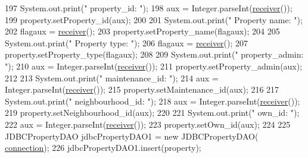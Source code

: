 \begin{DoxyCode}
197                         System.out.print(\textcolor{stringliteral}{"    property\_id: "});
198                         aux =  Integer.parseInt(\mbox{\hyperlink{classcms_1_1_c_m_s_ad13be0e97a0bb295dcedd134942a79b4}{receiver}}());
199                         \textcolor{keyword}{property}.setProperty\_id(aux);
200                         
201                         System.out.print(\textcolor{stringliteral}{"    Property name: "});
202                         flagaux = \mbox{\hyperlink{classcms_1_1_c_m_s_ad13be0e97a0bb295dcedd134942a79b4}{receiver}}();
203                         \textcolor{keyword}{property}.setProperty\_name(flagaux);
204                         
205                         System.out.print(\textcolor{stringliteral}{"    Property type: "});
206                         flagaux = \mbox{\hyperlink{classcms_1_1_c_m_s_ad13be0e97a0bb295dcedd134942a79b4}{receiver}}();
207                         \textcolor{keyword}{property}.setProperty\_type(flagaux);
208                         
209                         System.out.print(\textcolor{stringliteral}{"    property\_admin: "});
210                         aux =  Integer.parseInt(\mbox{\hyperlink{classcms_1_1_c_m_s_ad13be0e97a0bb295dcedd134942a79b4}{receiver}}());
211                         \textcolor{keyword}{property}.setProperty\_admin(aux);
212                                 
213                         System.out.print(\textcolor{stringliteral}{"    maintenance\_id: "});
214                         aux =  Integer.parseInt(\mbox{\hyperlink{classcms_1_1_c_m_s_ad13be0e97a0bb295dcedd134942a79b4}{receiver}}());
215                         \textcolor{keyword}{property}.setMaintenance\_id(aux);
216                         
217                         System.out.print(\textcolor{stringliteral}{"    neighbourhood\_id: "});
218                         aux =  Integer.parseInt(\mbox{\hyperlink{classcms_1_1_c_m_s_ad13be0e97a0bb295dcedd134942a79b4}{receiver}}());
219                         \textcolor{keyword}{property}.setNeighbourhood\_id(aux);
220                         
221                         System.out.print(\textcolor{stringliteral}{"    own\_id: "});
222                         aux =  Integer.parseInt(\mbox{\hyperlink{classcms_1_1_c_m_s_ad13be0e97a0bb295dcedd134942a79b4}{receiver}}());
223                         \textcolor{keyword}{property}.setOwn\_id(aux);
224                         
225                         JDBCPropertyDAO jdbcPropertyDAO1 = \textcolor{keyword}{new} JDBCPropertyDAO(
      \mbox{\hyperlink{classcms_1_1_c_m_s_afc28cfd2c4356509b85775219b7b1e05}{connection}});
226                         jdbcPropertyDAO1.insert(property);

\end{DoxyCode}
